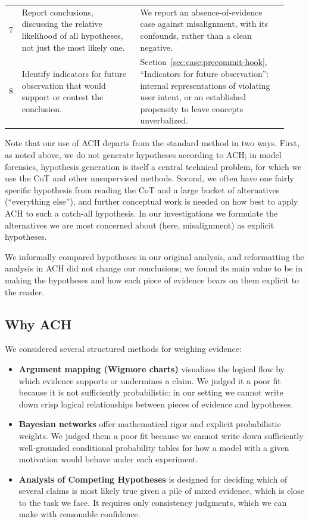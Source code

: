 \documentclass{article}
\begin{document}
\begin{table}[h]
\begin{tabular}{@{}p{0.03\linewidth}p{0.4\linewidth}p{0.5\linewidth}@{}}
    7 & Report conclusions, discussing the relative likelihood of all hypotheses, not just the most likely one. & We report an absence-of-evidence case against misalignment, with its confounds, rather than a clean negative. \\
    8 & Identify indicators for future observation that would support or contest the conclusion. & Section~\ref{sec:case:precommit-hook}, ``Indicators for future observation'': internal representations of violating user intent, or an established propensity to leave concepts unverbalized. \\
    \bottomrule
  \end{tabular}
\end{table}

Note that our use of ACH departs from the standard method in two ways. First, as noted above, we do not generate hypotheses according to ACH; in model forensics, hypothesis generation is itself a central technical problem, for which we use the CoT and other unsupervised methods. Second, we often have one fairly specific hypothesis from reading the CoT and a large bucket of alternatives (``everything else''), and further conceptual work is needed on how best to apply ACH to such a catch-all hypothesis. In our investigations we formulate the alternatives we are most concerned about (here, misalignment) as explicit hypotheses.

We informally compared hypotheses in our original analysis, and reformatting the analysis in ACH did not change our conclusions; we found its main value to be in making the hypotheses and how each piece of evidence bears on them explicit to the reader.

\subsection{Why ACH}
\label{app:ach-choice}

We considered several structured methods for weighing evidence:
\begin{itemize}
    \item \textbf{Argument mapping (Wigmore charts)} \citep{anderson2005analysis} visualizes the logical flow by which evidence supports or undermines a claim. We judged it a poor fit because it is not sufficiently probabilistic: in our setting we cannot write down crisp logical relationships between pieces of evidence and hypotheses.
    \item \textbf{Bayesian networks} \citep{fenton2013legal} offer mathematical rigor and explicit probabilistic weights. We judged them a poor fit because we cannot write down sufficiently well-grounded conditional probability tables for how a model with a given motivation would behave under each experiment.
    \item \textbf{Analysis of Competing Hypotheses} \citep{heuer1999psychology} is designed for deciding which of several claims is most likely true given a pile of mixed evidence, which is close to the task we face. It requires only consistency judgments, which we can make with reasonable confidence.
\end{itemize}
\end{document}
